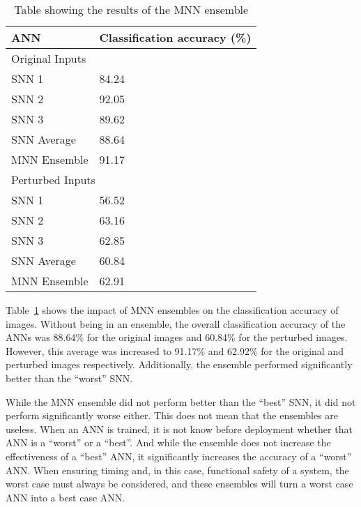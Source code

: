 \begin{table}[h]
	\centering
	\caption{Table showing the results of the \ac{MNN} ensemble}
	\label{tbl:sign-enemble}
	\begin{tabular}{|l||l|}
		\hline
		\ac{ANN} & Classification accuracy (\%) \\ \hline
		\multicolumn{2}{|l|}{Original Inputs} \\ \hline
		\ac{SNN} 1 & 84.24 \\ 
		\ac{SNN} 2 & 92.05 \\ 
		\ac{SNN} 3 & 89.62 \\ 
		\ac{SNN} Average & 88.64 \\
		\ac{MNN} Ensemble & 91.17 \\ 
		\hline
		\multicolumn{2}{|l|}{Perturbed Inputs} \\ \hline
		\ac{SNN} 1 & 56.52 \\ 
		\ac{SNN} 2 & 63.16 \\ 
		\ac{SNN} 3 & 62.85 \\ 
		\ac{SNN} Average & 60.84 \\
		\ac{MNN} Ensemble & 62.91 \\ 
		\hline
	\end{tabular}%
\end{table}

Table~\ref{tbl:sign-enemble} shows the impact of \ac{MNN} ensembles on the classification accuracy of images.
Without being in an ensemble, the overall classification accuracy of the \acp{ANN} was 88.64\% for the original images and 60.84\% for the perturbed images.
However, this average was increased to 91.17\% and 62.92\% for the original and perturbed images respectively.
Additionally, the ensemble performed significantly better than the ``worst'' \ac{SNN}.

While the \ac{MNN} ensemble did not perform better than the ``best'' \ac{SNN}, it did not perform significantly worse either.
This does not mean that the ensembles are useless.
When an \ac{ANN} is trained, it is not know before deployment whether that \ac{ANN} is a ``worst'' or a ``best''.
And while the ensemble does not increase the effectiveness of a ``best'' \ac{ANN}, it significantly increases the accuracy of a ``worst'' \ac{ANN}.
When ensuring timing and, in this case, functional safety of a system, the worst case must always be considered, and these ensembles will turn a worst case \ac{ANN} into a best case \ac{ANN}.

